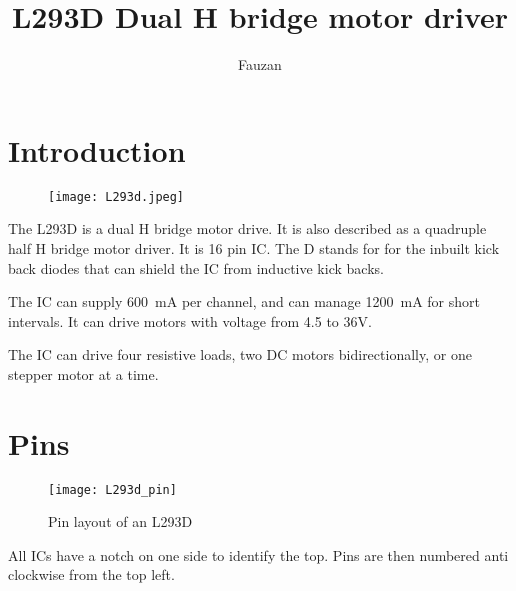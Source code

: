 \documentclass{article}
\title{L293D Dual H bridge motor driver}
\author{Fauzan}
\begin{document}
\newcommand{\inlncd}[1]{\colorbox{lgray}{\texttt{#1}}}
\newcommand{\icpin}[2]{\setlength{\fboxsep}{0pt}\fbox{\texttt{\colorbox{lgray}{\strut{}\,PIN~#1\,}\,#2\,}}\setlength{\fboxsep}{2pt}}


\maketitle



\section{Introduction}

	\begin{figure}[h]
		\centering
		\texttt{[image: L293d.jpeg]}
	\end{figure}

	The L293D is a dual H bridge motor drive. It is also described as a quadruple half H bridge motor driver. It is 16 pin IC. The D stands for for the inbuilt kick back diodes that can shield the IC from inductive kick backs.

	The IC can supply 600~mA per channel, and can manage 1200~mA for short intervals. It can drive motors with voltage from 4.5 to 36V.

	The IC can drive four resistive loads, two DC motors bidirectionally, or one stepper motor at a time.

\newpage

\section{Pins}

	\begin{figure}[h]
		\centering
		\texttt{[image: L293d\_pin]}
		\caption{Pin layout of an L293D}
	\end{figure}

	All ICs have a notch on one side to identify the top. Pins are then numbered anti clockwise from the top left.
\end{document}
